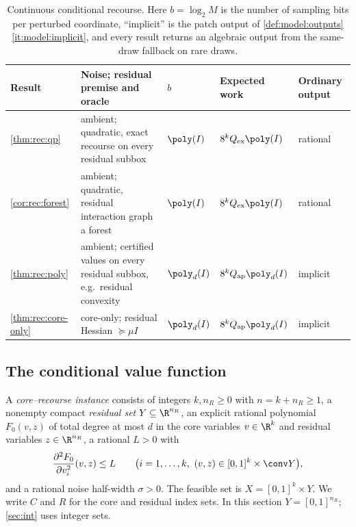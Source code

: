 \begin{table}[t]
\centering
\caption{Continuous conditional recourse. Here $b=\log_2M$ is the number of
sampling bits per perturbed coordinate, ``implicit'' is the patch output of
\cref{def:model:outputs}\ref{it:model:implicit}, and every result returns an
algebraic output from the same-draw fallback on rare draws.}
\label{tab:rec:summary}
\small
\begin{tabularx}{\textwidth}{@{}lXlll@{}}
\toprule
Result & Noise; residual premise and oracle & $b$ & Expected work & Ordinary output\\
\midrule
\cref{thm:rec:qp} & ambient; quadratic, exact recourse on every residual
subbox & $\poly(I)$ & $8^kQ_{\rm ex}\poly(I)$ & rational\\
\cref{cor:rec:forest} & ambient; quadratic, residual interaction graph a
forest & $\poly(I)$ & $8^kQ_{\rm ex}\poly(I)$ & rational\\
\cref{thm:rec:poly} & ambient; certified values on every residual subbox,
e.g.\ residual convexity & $\poly_d(I)$ & $8^kQ_{\rm ap}\poly_d(I)$ & implicit\\
\cref{thm:rec:core-only} & core-only; residual Hessian $\succeq\mu I$
& $\poly_d(I)$ & $8^kQ_{\rm ap}\poly_d(I)$ & implicit\\
\bottomrule
\end{tabularx}
\end{table}

\subsection{The conditional value function}\label{sec:rec:value}

\begin{definition}\label{def:rec:instance}
A \emph{core--recourse instance} consists of integers $k,n_R\ge0$ with
$n=k+n_R\ge1$, a nonempty compact \emph{residual set}
$Y\subseteq\R^{n_R}$, an explicit rational polynomial $F_0(v,z)$ of total
degree at most $d$ in the core variables $v\in\R^k$ and residual variables
$z\in\R^{n_R}$, a rational $L>0$ with
\begin{equation}\label{eq:rec:L}
 \frac{\partial^2F_0}{\partial v_i^2}(v,z)\le L
 \qquad\bigl(i=1,\ldots,k,\ (v,z)\in[0,1]^k\times\conv Y\bigr),
\end{equation}
and a rational noise half-width $\sigma>0$. The feasible set is
$X=[0,1]^k\times Y$. We write $C$ and $R$ for the core and residual index
sets. In this section $Y=[0,1]^{n_R}$; \cref{sec:int} uses integer sets.
\end{definition}

